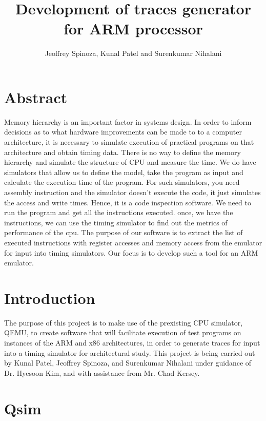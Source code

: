 \documentclass[letterpaper,11pt,twocolumn]{article}
\title{Development of traces generator for ARM processor}
\author{Jeoffrey Spinoza, Kunal Patel and Surenkumar Nihalani}
\begin{document}
\maketitle

\section{Abstract}
Memory hierarchy is an important factor in systems design. In order to inform decisions as to what hardware improvements can be made to to a computer architecture, it is necessary to simulate execution of practical programs on that architecture and obtain timing data. There is no way to define the memory hierarchy and simulate the structure of CPU and measure the time. We do have simulators that allow us to define the model, take the program as input and calculate the execution time of the program. For such simulators, you need assembly instruction and the simulator doesn't execute the code, it just simulates the access and write times. Hence, it is a code inspection software. We need to run the program and get all the instructions executed. once, we have the instructions, we can use the timing simulator to find out the metrics of performance of the cpu. The purpose of our software is to extract the list of executed instructions with register accesses and memory access from the emulator for input into timing simulators. Our focus is to develop such a tool for an ARM emulator.



\section{Introduction}
The purpose of this project is to make use of the prexisting CPU simulator, QEMU, to create software that will facilitate execution of test programs on instances of the ARM and x86 architectures, in order to generate traces for input into a timing simulator for architectural study. This project is being carried out by Kunal Patel, Jeoffrey Spinoza, and Surenkumar Nihalani under guidance of Dr. Hyesoon Kim, and with assistance from Mr. Chad Kersey.


\section{Qsim}
\end{document}
